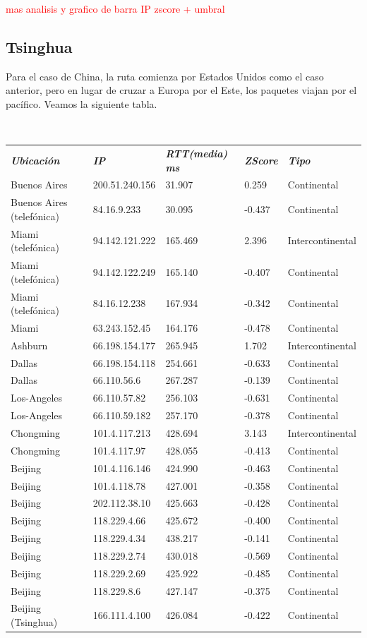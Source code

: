 \textcolor{red}{mas analisis y grafico de barra IP zscore + umbral}

\subsection{Tsinghua}

Para el caso de China, la ruta comienza por Estados Unidos como el caso anterior, pero en lugar de cruzar a Europa por el Este, los paquetes viajan por el pac\'ifico.
Veamos la siguiente tabla.

~

\begin{tabular}{lllll}
	\textit{\textbf{Ubicaci\'on}}	&	\textit{\textbf{IP}}	&	\textit{\textbf{RTT(media) ms}}	&	\textit{\textbf{ZScore}}	&	\textit{\textbf{Tipo}}	\\
	Buenos Aires			&	200.51.240.156	&	31.907	&	0.259	&	Continental	\\
	Buenos Aires (telef\'onica)	&	84.16.9.233	&	30.095	&	-0.437	&	Continental	\\
	Miami (telef\'onica)		&	94.142.121.222	&	165.469	&	2.396	&	Intercontinental	\\
	Miami (telef\'onica)		&	94.142.122.249	&	165.140	&	-0.407	&	Continental	\\
	Miami (telef\'onica)		&	84.16.12.238	&	167.934	&	-0.342	&	Continental	\\
	Miami 				&	63.243.152.45	&	164.176	&	-0.478	&	Continental	\\
	Ashburn				&	66.198.154.177	&	265.945	&	1.702	&	Intercontinental	\\
	Dallas				&	66.198.154.118	&	254.661	&	-0.633	&	Continental	\\
	Dallas				&	66.110.56.6	&	267.287	&	-0.139	&	Continental	\\
	Los-Angeles			&	66.110.57.82	&	256.103	&	-0.631	&	Continental	\\
	Los-Angeles			&	66.110.59.182	&	257.170	&	-0.378	&	Continental	\\
	Chongming				&	101.4.117.213	&	428.694	&	3.143	&	Intercontinental	\\
	Chongming				&	101.4.117.97	&	428.055	&	-0.413	&	Continental	\\
	Beijing				&	101.4.116.146	&	424.990	&	-0.463	&	Continental	\\
	Beijing				&	101.4.118.78	&	427.001	&	-0.358	&	Continental	\\
	Beijing				&	202.112.38.10	&	425.663	&	-0.428	&	Continental	\\
	Beijing				&	118.229.4.66	&	425.672	&	-0.400	&	Continental	\\
	Beijing				&	118.229.4.34	&	438.217	&	-0.141	&	Continental	\\
	Beijing				&	118.229.2.74	&	430.018	&	-0.569	&	Continental	\\
	Beijing				&	118.229.2.69	&	425.922	&	-0.485	&	Continental	\\
	Beijing				&	118.229.8.6	&	427.147	&	-0.375	&	Continental	\\
	Beijing (Tsinghua)		&	166.111.4.100	&	426.084	&	-0.422	&	Continental	\\

\end{tabular}

